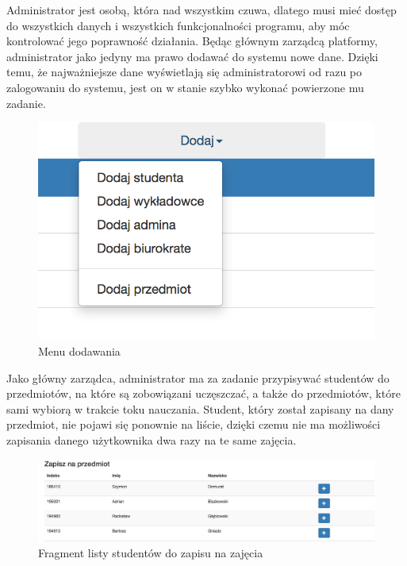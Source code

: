 \documentclass{xmgr}
\begin{document}
Administrator jest osobą, która nad wszystkim czuwa, dlatego musi mieć dostęp do wszystkich danych i wszystkich funkcjonalności programu, aby móc kontrolować jego poprawność działania. Będąc głównym zarządcą platformy, administrator jako jedyny ma prawo dodawać do systemu nowe dane. Dzięki temu, że najważniejsze dane wyświetlają się administratorowi od razu po zalogowaniu do systemu, jest on w stanie szybko wykonać powierzone mu zadanie.

\begin{figure}[th!]
\centering
\includegraphics[scale=0.6]{images/menu.png} 
\caption{Menu dodawania\label{RYS.4}}
\end{figure}


Jako główny zarządca, administrator ma za zadanie przypisywać studentów do przedmiotów, na które są zobowiązani uczęszczać, a także do przedmiotów, które sami wybiorą w trakcie toku nauczania. Student, który został zapisany na dany przedmiot, nie pojawi się ponownie na liście, dzięki czemu nie ma możliwości zapisania danego użytkownika dwa razy na te same zajęcia.

\begin{figure}[th!]
\centering
\includegraphics[width=1.1\hsize]{images/addStudent} 
\caption{Fragment listy studentów do zapisu na zajęcia\label{RYS.5}}
\end{figure}
\end{document}
